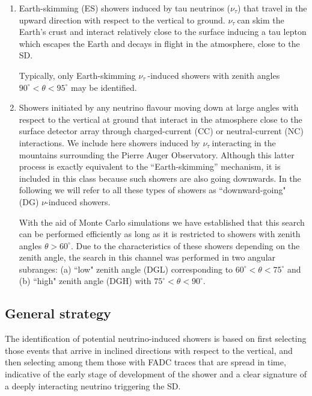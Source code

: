 \documentclass[reprint,showpacs,showkeys,amsmath,amssymb,aps,nofootinbib]{revtex4-1}
\def \nutau {$\nu_\tau~$}
\def \pao {Pierre Auger Observatory}
\begin{document}
\begin{enumerate}

\item 
Earth-skimming (ES) showers induced by tau neutrinos ($\nu_\tau$)
that travel in the upward direction with respect to the vertical to ground.
\nutau can skim the Earth's crust and interact relatively close to the surface 
inducing a tau lepton which escapes the Earth and decays in flight in the atmosphere,
close to the SD. 

Typically, only Earth-skimming \nutau-induced showers with zenith 
angles $90^\circ < \theta < 95^\circ$ may be identified. 

\item 
Showers initiated by any neutrino flavour moving down at large angles with respect
to the vertical at ground that interact 
in the atmosphere close 
to the surface detector array
through charged-current (CC) or neutral-current
(NC) interactions.  We include here showers induced
by \nutau interacting in the mountains surrounding the \pao. Although  
this latter process is exactly equivalent to the
``Earth-skimming'' mechanism, it is included in this class because such showers 
are also going downwards. In the following we will refer to all these types
of showers as ``downward-going" (DG) $\nu$-induced showers.

With the aid of Monte Carlo simulations we have established that this search can be performed 
efficiently as long as it is restricted to showers with zenith 
angles $\theta > 60^\circ$. Due to the characteristics
of these showers depending on the zenith angle, the search in this 
channel was performed in two angular subranges: 
(a) ``low" zenith angle (DGL) corresponding to $60^\circ < \theta < 75^\circ$ 
and (b) ``high" zenith angle (DGH) with $75^\circ < \theta < 90^\circ$. 

\end{enumerate}


\subsection{General strategy} 

The identification of potential neutrino-induced showers 
is based on first selecting those events that arrive in inclined directions with respect to the vertical,
and then selecting among them those with FADC traces that are spread in time,
indicative of the early stage of development of the shower and 
a clear signature of a deeply interacting neutrino triggering the SD.
\end{document}
